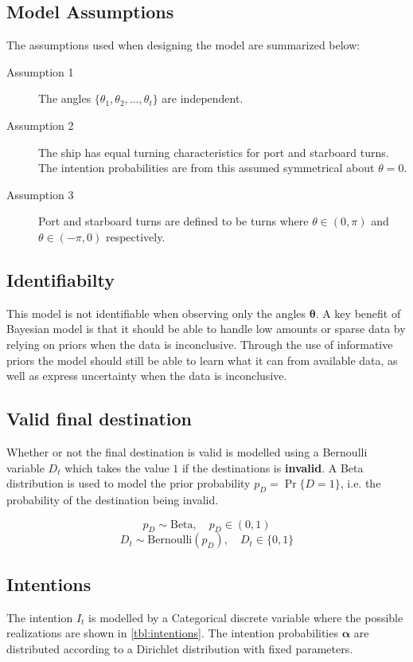 \subsection{Model Assumptions}
The assumptions used when designing the model are summarized below:
\begin{description}
    \item[Assumption 1] The angles $\{\theta_1, \theta_2, \dots, \theta_t\}$ are independent.
    \item[Assumption 2] The ship has equal turning characteristics for port and starboard turns. The intention probabilities are from this assumed symmetrical about $\theta=0$. 
    \item[Assumption 3] Port and starboard turns are defined to be turns where $\theta \in (0, \pi)$ and $\theta \in (-\pi, 0)$ respectively.
\end{description}

\subsection{Identifiabilty}
This model is not identifiable when observing only the angles $\boldsymbol{\theta}$. A key benefit of Bayesian model is that it should be able to handle low amounts or sparse data by relying on priors when the data is inconclusive. Through the use of informative priors the model should still be able to learn what it can from available data, as well as express uncertainty when the data is inconclusive.

\subsection{Valid final destination}
Whether or not the final destination is valid is modelled using a Bernoulli variable $D_t$ which takes the value $1$ if the destinations is \textbf{invalid}. A Beta distribution is used to model the prior probability $p_D = \Pr \{D=1\}$, i.e. the probability of the destination being invalid.  

\begin{equation}
    p_D \sim \text{Beta}, \quad p_D \in (0, 1)
\end{equation}
\begin{equation}
    D_t \sim \text{Bernoulli}(p_D), \quad D_t \in \{0, 1\}
\end{equation}

\subsection{Intentions}
The intention $I_t$ is modelled by a Categorical discrete variable where the possible realizations are shown in \cref{tbl:intentions}. The intention probabilities $\boldsymbol{\alpha}$ are distributed according to a Dirichlet distribution with fixed parameters.

